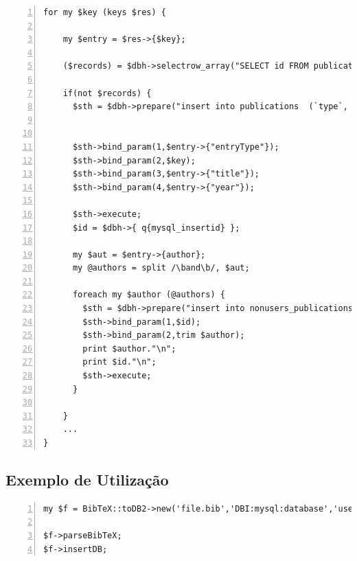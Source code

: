 \documentclass[a4paper,11pt,openright,openbib]{article}
\begin{document}
\begin{lstlisting}[numbers=left]
for my $key (keys $res) {
    
    my $entry = $res->{$key};

    ($records) = $dbh->selectrow_array("SELECT id FROM publications as p where p.key=\'$key\';");

    if(not $records) {
      $sth = $dbh->prepare("insert into publications  (`type`, `key`, `title`, `year`) values (?,?,?,?)");
      
      
      $sth->bind_param(1,$entry->{"entryType"});
      $sth->bind_param(2,$key);
      $sth->bind_param(3,$entry->{"title"});
      $sth->bind_param(4,$entry->{"year"});

      $sth->execute;
      $id = $dbh->{ q{mysql_insertid} };

      my $aut = $entry->{author};     
      my @authors = split /\band\b/, $aut;          
      
      foreach my $author (@authors) {
        $sth = $dbh->prepare("insert into nonusers_publications (`publications_id`, `name`) values (?,?)");   
        $sth->bind_param(1,$id);
        $sth->bind_param(2,trim $author);
        print $author."\n";
        print $id."\n";
        $sth->execute;
      }

    }
    ...
}
\end{lstlisting}
  

\subsection{Exemplo de Utilização}

\lstset{language=Perl}
\lstset{basicstyle=\ttfamily\footnotesize}
\lstset{commentstyle=\textit}
\lstset{breaklines=true}
\begin{lstlisting}[numbers=left]
my $f = BibTeX::toDB2->new('file.bib','DBI:mysql:database','user','pass');

$f->parseBibTeX;
$f->insertDB;
\end{lstlisting}
\end{document}
